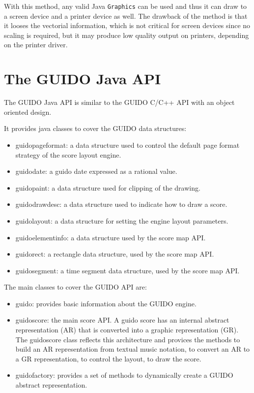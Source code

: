\documentclass[a4paper]{article}
\newcommand{\code}[1]			{\texttt{#1}}
\begin{document}
With this method, any valid Java \code{Graphics} can be used and thus it can draw to a screen device and a printer 
device as well. The drawback of the method is that it looses the vectorial information, which is not critical for screen devices since no scaling is required, but it may produce low quality output on printers, depending on the printer driver.


\section{The GUIDO Java API}

The GUIDO Java API is similar to the GUIDO C/C++ API \cite{devdoc} with an object oriented design. 

It provides java classes to cover the GUIDO data structures:
\begin{itemize}
\item guidopageformat: a data structure used to control the default page format strategy of the score layout engine.
\item guidodate: a guido date expressed as a rational value.
\item guidopaint: a data structure used for clipping of the drawing.
\item guidodrawdesc: a data structure used to indicate how to draw a score.
\item guidolayout: a data structure for setting the engine layout parameters.
\item guidoelementinfo: a data structure used by the score map API.
\item guidorect: a rectangle data structure, used by the score map API.
\item guidosegment: a time segment data structure, used by the score map API.
\end{itemize}

The main classes to cover the GUIDO API are:
\begin{itemize}
\item guido: provides basic information about the GUIDO engine.
\item guidoscore: the main score API. A guido score has an internal abstract representation (AR) 
that is converted into a graphic representation (GR).
The guidoscore class reflects this architecture and provices the methods to build an AR representation 
from textual music notation, to convert an AR to a GR representation, to control the layout, to draw the score.
\item guidofactory: provides a set of methods to dynamically create a GUIDO abstract representation.
\end{itemize}
\end{document}

